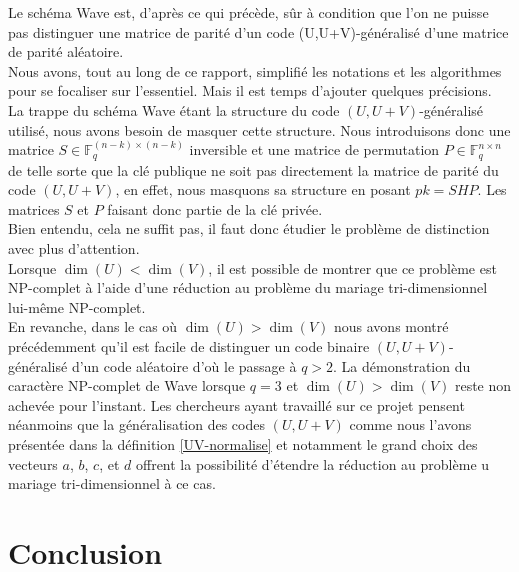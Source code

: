 \documentclass[12pt]{article}
\theoremstyle{plain}
\newcommand{\F}{\mathbb{F}}
\begin{document}
Le schéma Wave est, d'après ce qui précède, sûr à condition que l'on ne puisse pas distinguer une matrice de parité d'un code (U,U+V)-généralisé d'une matrice de parité aléatoire. \\

\noindent Nous avons, tout au long de ce rapport, simplifié les notations et les algorithmes pour se focaliser sur l'essentiel. 
Mais il est temps d'ajouter quelques précisions.
La trappe du schéma Wave étant la structure du code $(U,U+V)$-généralisé utilisé, nous avons besoin de masquer cette structure. Nous introduisons donc une matrice $S\in\F_q^{(n-k)\times(n-k)}$ inversible et une matrice de permutation $P\in\F_q^{n\times n}$ de telle sorte que la clé publique ne soit pas directement la matrice de parité du code $(U,U+V)$, en effet, nous masquons sa structure en posant $pk = SHP$. Les matrices $S$ et $P$ faisant donc partie de la clé privée.\\
Bien entendu, cela ne suffit pas, il faut donc étudier le problème de distinction avec plus d'attention.\\

\noindent Lorsque $\dim(U) < \dim(V)$, il est possible de montrer que ce problème est NP-complet à l'aide d'une réduction au problème du mariage tri-dimensionnel lui-même NP-complet. \\
En revanche, dans le cas où $\dim(U) > \dim(V)$ nous avons montré précédemment qu'il est facile de distinguer un code binaire $(U,U+V)$-généralisé d'un code aléatoire d'où le passage à $q>2$.
La démonstration du caractère NP-complet de Wave lorsque $q=3$ et $\dim(U) > \dim(V)$ reste non achevée pour l'instant.
Les chercheurs ayant travaillé sur ce projet pensent néanmoins que la généralisation des codes $(U,U+V)$ comme nous l'avons présentée dans la définition \ref{UV-normalise} et notamment le grand choix des vecteurs $a$, $b$, $c$, et $d$ offrent la possibilité d'étendre la réduction au problème u mariage tri-dimensionnel à ce cas.\\

\section*{Conclusion}

\newpage
\end{document}
